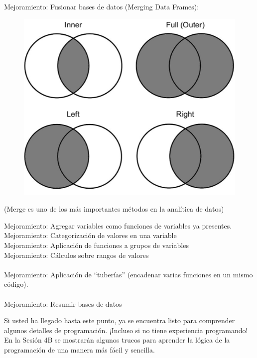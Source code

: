 \documentclass[aspectratio=169]{beamer}
\begin{document}
\begin{frame}
Mejoramiento: Fusionar bases de datos (Merging Data Frames):\\
\vspace{0.5cm}
\begin{figure}
\centering
\includegraphics[width=.4\textwidth]{joins.png}
\end{figure}
\centering
(Merge es uno de los más importantes métodos en la analítica de datos)
\end{frame}

\begin{frame}
Mejoramiento: Agregar variables como funciones de variables ya presentes.\\
\vspace{0.5cm}
Mejoramiento: Categorización de valores en una variable\\
\vspace{0.5cm}
Mejoramiento: Aplicación de funciones a grupos de variables\\
\vspace{0.5cm}
Mejoramiento: Cálculos sobre rangos de valores\\
\vspace{0.5cm}\\
Mejoramiento: Aplicación de ``tuberías'' (encadenar varias funciones en un mismo código).\\
\vspace{0.5cm}\\
Mejoramiento: Resumir bases de datos
\end{frame}

\begin{frame}
Si usted ha llegado hasta este punto, ya se encuentra listo para comprender algunos detalles de programación. ¡Incluso si no tiene experiencia programando!\\
\vspace{0.5cm}
En la Sesión 4B se mostrarán algunos trucos para aprender la lógica de la programación de una manera más fácil y sencilla.
\end{frame}
\end{document}
